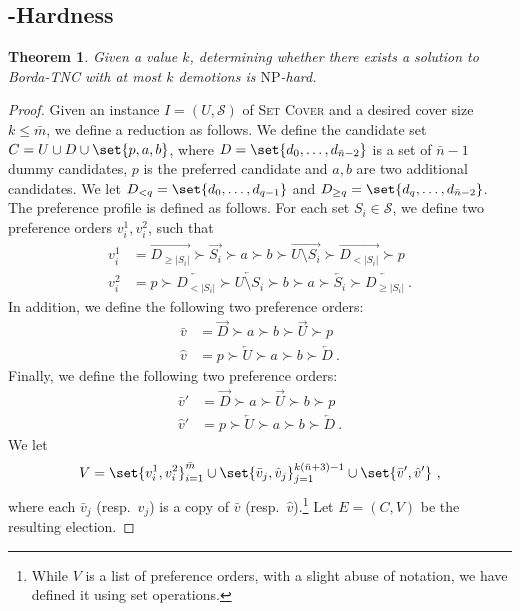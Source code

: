 \documentclass[letterpaper]{article} %
\newtheorem{theorem}{Theorem}
\newcommand{\SC}{\textsc{Set Cover}}
\newcommand{\SB}{\textsc{TNC}}
\newcommand{\ora}[1]{\overrightarrow{#1}}
\newcommand{\ola}[1]{\overleftarrow{#1}}
\newcommand{\abs}[1]{\lvert{#1}\rvert}
\newcommand{\NP}{\mathrm{NP}}
\begin{document}
\subsection{\boldmath{$\NP$}-Hardness}\label{sec:borda_hardness}
\begin{theorem}\label{thr:borda_hardness}
Given a value $k$, determining whether there exists a solution to Borda-\SB{} with at most $k$ demotions  is $\NP$-hard.
\end{theorem}
\begin{proof}
Given an instance $I=(U,\mathcal{S})$ of \SC{} and a desired cover size $k \leq \bar{m}$, we define a reduction as follows.
We define the candidate set $C=U \cup  D \cup \set{p,a,b}$, where $D=\set{d_0,\ldots,d_{\bar{n}-2}}$ is a set of $\bar{n}-1$ dummy candidates, $p$ is the preferred candidate and $a,b$ are  two additional candidates. We let $D_{<q}=\set{d_0,\ldots,d_{q-1}}$ and $D_{\geq q}=\set{d_{q},\ldots,d_{\bar{n}-2}}$.
The preference profile is defined as follows. For each set $S_i \in \mathcal{S}$, we define two preference orders $v_i^1,v_i^2$, such that
\begin{align}
    v_i^1 &= \ora{D_{\geq \abs{S_i}}} \succ  \ora{S_i}  \succ  a \succ b \succ \ora{U \setminus S_i}\succ \ora{D_{<\abs{S_i}}} \succ p   \\
    v_i^2 &=  p  \succ \ola{D_{<\abs{S_i}}} \succ \ola{U \setminus S_i} \succ b \succ a \succ \ola{S_i} \succ  \ola{D_{\geq \abs{S_i}}}\ .
\end{align}
In addition, we define the following two preference orders:
\begin{align}
    \bar{v} &=  \ora{D} \succ a \succ b \succ  \ora{U}  \succ p \\
    \hat{v} &=  p \succ \ola{U}  \succ a \succ b \succ \ola{D} \ .
\end{align}
Finally, we define the following two preference orders:
\begin{align}
    \bar{v}' &= \ora{D} \succ a \succ \ora{U} \succ b  \succ p  \\
    \hat{v}' &=  p \succ \ola{U}  \succ a \succ b \succ \ola{D}\ .
\end{align}
We let
$$V=\set{v_i^1,v_i^2}_{i=1}^{\bar{m}} \cup \set{\bar{v}_j, \hat{v}_j}_{j=1}^{k(\bar{n}+3)-1} \cup \set{\bar{v}', \hat{v}'}\ ,$$
where each $\bar{v}_j$ (resp.\  $\hat{v}_j$) is a copy of $\bar{v}$ (resp.\  $\hat{v}$).\footnote{While $V$ is a list of preference orders, with a slight abuse of notation, we have defined it using set operations.} Let $E = (C,V)$ be the resulting election.

\end{proof}
\end{document}
